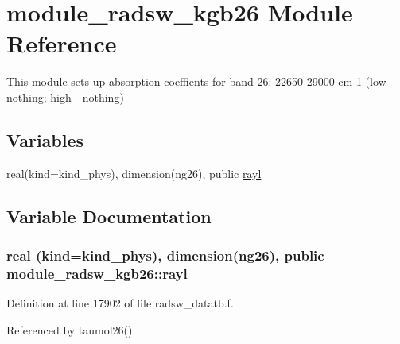 \hypertarget{namespacemodule__radsw__kgb26}{}\section{module\+\_\+radsw\+\_\+kgb26 Module Reference}
\label{namespacemodule__radsw__kgb26}


This module sets up absorption coeffients for band 26\+: 22650-\/29000 cm-\/1 (low -\/ nothing; high -\/ nothing)  


\subsection*{Variables}
\begin{DoxyCompactItemize}
\item 
real(kind=kind\+\_\+phys), dimension(ng26), public \hyperlink{namespacemodule__radsw__kgb26_ab090be57484d2c5b67dda3d83c1c542b}{rayl}
\end{DoxyCompactItemize}


\subsection{Variable Documentation}
\subsubsection[{\texorpdfstring{rayl}{rayl}}]{\setlength{\rightskip}{0pt plus 5cm}real (kind=kind\+\_\+phys), dimension(ng26), public module\+\_\+radsw\+\_\+kgb26\+::rayl}\hypertarget{namespacemodule__radsw__kgb26_ab090be57484d2c5b67dda3d83c1c542b}{}\label{namespacemodule__radsw__kgb26_ab090be57484d2c5b67dda3d83c1c542b}


Definition at line 17902 of file radsw\+\_\+datatb.\+f.



Referenced by taumol26().

